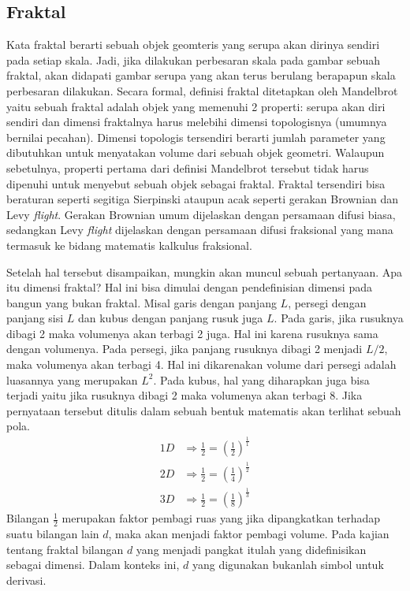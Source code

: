 \subsection{Fraktal}
Kata fraktal berarti sebuah objek geomteris yang serupa akan dirinya sendiri pada setiap skala. Jadi, jika dilakukan perbesaran skala pada gambar sebuah fraktal, akan didapati gambar serupa yang akan terus berulang berapapun skala perbesaran dilakukan. Secara formal, definisi fraktal ditetapkan oleh Mandelbrot yaitu sebuah fraktal adalah objek yang memenuhi 2 properti: serupa akan diri sendiri dan dimensi fraktalnya harus melebihi dimensi topologisnya (umumnya bernilai pecahan). Dimensi topologis tersendiri berarti jumlah parameter yang dibutuhkan untuk menyatakan volume dari sebuah objek geometri. Walaupun sebetulnya, properti pertama dari definisi Mandelbrot tersebut tidak harus dipenuhi untuk menyebut sebuah objek sebagai fraktal. Fraktal tersendiri bisa beraturan seperti segitiga Sierpinski ataupun acak seperti gerakan Brownian dan Levy \textit{flight}. Gerakan Brownian umum dijelaskan dengan persamaan difusi biasa, sedangkan Levy \textit{flight} dijelaskan dengan persamaan difusi fraksional yang mana termasuk ke bidang matematis kalkulus fraksional. \cite{Herrmann2014Fractional}
\par Setelah hal tersebut disampaikan, mungkin akan muncul sebuah pertanyaan. Apa itu dimensi fraktal? Hal ini bisa dimulai dengan pendefinisian dimensi pada bangun yang bukan fraktal. Misal garis dengan panjang \(L\), persegi dengan panjang sisi \(L\) dan kubus dengan panjang rusuk juga \(L\). Pada garis, jika rusuknya dibagi 2 maka volumenya akan terbagi 2 juga. Hal ini karena rusuknya sama dengan volumenya. Pada persegi, jika panjang rusuknya dibagi 2 menjadi \(L/2\), maka volumenya akan terbagi 4. Hal ini dikarenakan volume dari persegi adalah luasannya yang merupakan \(L^2\). Pada kubus, hal yang diharapkan juga bisa terjadi yaitu jika rusuknya dibagi 2 maka volumenya akan terbagi 8. Jika pernyataan tersebut ditulis dalam sebuah bentuk matematis akan terlihat sebuah pola.
\begin{align}
    1D &\Rightarrow \frac{1}{2} = \left(\frac{1}{2}\right)^\frac{1}{1}\\
    2D &\Rightarrow \frac{1}{2} = \left(\frac{1}{4}\right)^\frac{1}{2}\\
    3D &\Rightarrow \frac{1}{2} = \left(\frac{1}{8}\right)^\frac{1}{3}
\end{align}
Bilangan \(\frac{1}{2}\) merupakan faktor pembagi ruas yang jika dipangkatkan terhadap suatu bilangan lain \(d\), maka akan menjadi faktor pembagi volume. Pada kajian tentang fraktal bilangan \(d\) yang menjadi pangkat itulah yang didefinisikan sebagai dimensi. Dalam konteks ini, \(d\) yang digunakan bukanlah simbol untuk derivasi. \cite{Falconer2004Fractal}
